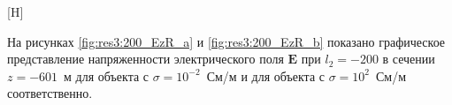 \documentclass[a4paper,14pt]{article}
\makeatletter
\renewenvironment{figure}[1][\fps@figure]{
  \edef\@tempa{\noexpand\@float{figure}[#1]}
  \@tempa
  \addtocounter{foofigure}{1}
}{
  \end@float
}
\renewcommand{\Re}{\mathop{\mathrm{Re}}\nolimits}
\makeatother
\begin{document}
\begin{figure}[H]
	\centering
	\text{~~}
	\caption{векторы $(\Re(\mathbf{E}_x), \Re{\mathbf{E}_z})^T$, изолинии $\Re(\mathbf{E}_y)$ при $l_2=-200$}
	\label{fig:res3:200_vec}
\end{figure}

На рисунках \ref{fig:res3:200_EzR_a} и \ref{fig:res3:200_EzR_b} показано графическое представление напряженности электрического поля $\mathbf{E}$ при $l_2=-200$ в сечении $z=-601$~м для объекта с $\sigma=10^{-2}$~См/м и для объекта с $\sigma=10^{2}$~См/м соответственно.
\end{document}
